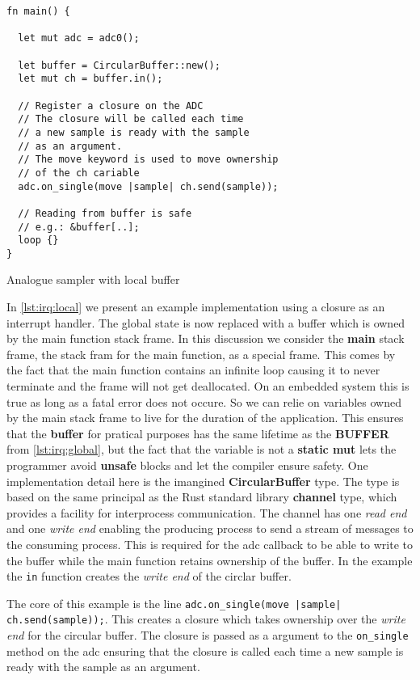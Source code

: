 \begin{listing}[H]
  \begin{verbatim}
fn main() {

  let mut adc = adc0();

  let buffer = CircularBuffer::new();
  let mut ch = buffer.in();

  // Register a closure on the ADC
  // The closure will be called each time
  // a new sample is ready with the sample
  // as an argument.
  // The move keyword is used to move ownership
  // of the ch cariable
  adc.on_single(move |sample| ch.send(sample));

  // Reading from buffer is safe
  // e.g.: &buffer[..];
  loop {}
}
  \end{verbatim}
  \caption{Analogue sampler with local buffer}
  \label{lst:irq:local}
\end{listing}

In \autoref{lst:irq:local} we present an example implementation using a closure as an interrupt handler.
The global state is now replaced with a buffer which is owned by the main function stack frame.
In this discussion we consider the \textbf{main} stack frame, the stack fram for the main function, as a special frame.
This comes by the fact that the main function contains an infinite loop causing it to never terminate and the frame will not get deallocated.
On an embedded system this is true as long as a fatal error does not occure.
So we can relie on variables owned by the main stack frame to live for the duration of the application.
This ensures that the \textbf{buffer} for pratical purposes has the same lifetime as the \textbf{BUFFER} from \autoref{lst:irq:global}, but the fact that the variable is not a \textbf{static mut} lets the programmer avoid \textbf{unsafe} blocks and let the compiler ensure safety.
One implementation detail here is the imangined \textbf{CircularBuffer} type.
The type is based on the same principal as the Rust standard library \textbf{channel} type, which provides a facility for interprocess communication.
The channel has one \textit{read end} and one \textit{write end} enabling the producing process to send a stream of messages to the consuming process.
This is required for the \gls{adc} callback to be able to write to the buffer while the main function retains ownership of the buffer.
In the example the \texttt{in} function creates the \textit{write end} of the circlar buffer.

The core of this example is the line \texttt{adc.on\_single(move |sample| ch.send(sample));}.
This creates a closure which takes ownership over the \textit{write end} for the circular buffer.
The closure is passed as a argument to the \texttt{on\_single} method on the \gls{adc} ensuring that the closure is called each time a new sample is ready with the sample as an argument.

